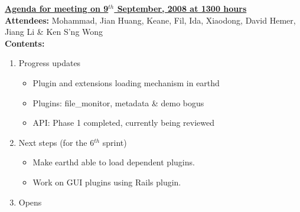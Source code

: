 \documentclass{letter}
\begin{document}
{\large \textbf{\underline{Agenda for meeting on 9$^{th}$ September, 2008 at 1300 hours}}}\\

\textbf{Attendees:} Mohammad, Jian Huang, Keane, Fil, Ida, Xiaodong, David Hemer, Jiang Li \& Ken S'ng Wong \\

\textbf{Contents:}

\begin{enumerate}
	\item Progress updates
		\begin{itemize}
			\item Plugin and extensions loading mechanism in earthd
			\item Plugins: file\_monitor, metadata \& demo bogus
			  \item API: Phase 1 completed, currently being reviewed
		\end{itemize}
	\item Next steps (for the 6$^{th}$ sprint)
		\begin{itemize}
			\item Make earthd able to load dependent plugins.
			\item Work on GUI plugins using Rails plugin.
		\end{itemize}
	\item Opens
\end{enumerate}
\end{document}
